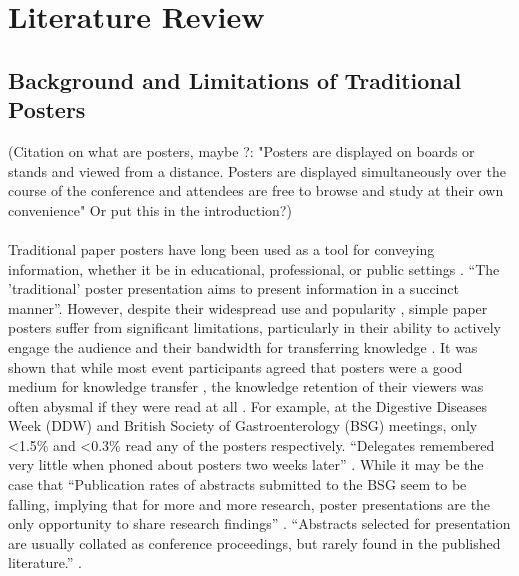 \chapter{Literature Review}
\label{sec:Related_Work}

\section{Background and Limitations of Traditional Posters}
(Citation on what are posters, maybe \cite{Soon}?: "Posters are displayed on boards or stands and viewed from a distance. Posters are displayed simultaneously over the course of the conference and attendees are free to browse and study at their own convenience" Or put this in the introduction?)\\\\

Traditional paper posters have long been used as a tool for conveying information, whether it be in educational, professional, or public settings \cite{Soon, IlicRowe3}. \enquote{The 'traditional' poster presentation aims to present information in a succinct manner}\cite{IlicRowe4}. However, despite their widespread use and popularity \cite{IlicRowe3}, simple paper posters suffer from significant limitations, particularly in their ability to actively engage the audience and their bandwidth for transferring knowledge \cite{IlicRowe1}. It was shown that while most event participants agreed that posters were a good medium for knowledge transfer \cite{Arslan, goodhand}, the knowledge retention of their viewers was often abysmal if they were read at all \cite{goodhand}. For example, at the Digestive Diseases Week (DDW) and British Society of Gastroenterology (BSG) meetings, only \textless1.5\% and \textless0.3\% read any of the posters respectively. \enquote{Delegates remembered very little when phoned about posters two weeks later} \cite{goodhand}. While it may be the case that \enquote{Publication rates of abstracts submitted to the BSG seem to be falling, implying that for more and more research, poster presentations are the only opportunity to share research findings} \cite{goodhand}. \enquote{Abstracts selected for presentation are usually collated as conference proceedings, but rarely found in the published literature.} \cite{Soon}. \\


